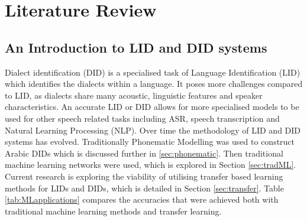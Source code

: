 \chapter{Literature Review}\label{ch:lit review}
\section{An Introduction to LID and DID systems}
Dialect identification (DID) is a specialised task of Language Identification (LID)
which identifies the dialects within a language. It poses more challenges compared to LID, 
as dialects share many acoustic, linguistic features and speaker characteristics. An accurate LID 
or DID allows for more specialised models to be used for other speech related tasks including ASR, speech transcription and 
Natural Learning Processing (NLP).
Over time the methodology of LID and DID systems has evolved. 
Traditionally Phonematic Modelling was used to construct Arabic DIDs which is discussed further in 
\ref{sec:phonematic}. Then traditional machine learning networks were used, which is explored in Section 
\ref{sec:tradML}. Current research is exploring the viability of utilising transfer based learning methods 
for LIDs and DIDs, which is detailed in Section \ref{sec:transfer}. Table \ref{tab:MLapplications} compares 
the accuracies that were achieved both with traditional machine learning methods and transfer learning.  



